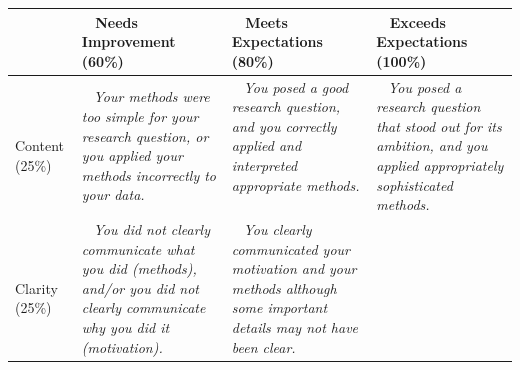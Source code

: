 \documentclass{article}
\begin{document}
      \vspace{5mm}
      \hspace{-15mm}
      \begin{tabular}{|>{\centering\arraybackslash}p{2.5cm}|>{\centering\arraybackslash}p{5cm}|>{\centering\arraybackslash}p{5cm}|>{\centering\arraybackslash}p{5cm}|}
        \hline
          ~
          \newline ~ & ~ \newline
          Needs Improvement (60\%)
          \newline ~ & ~ \newline
          Meets Expectations (80\%)
          \newline ~ & ~ \newline
          Exceeds Expectations (100\%)
          \newline ~\\
        \hline
        ~ \newline
        Content \newline (25\%)
          \newline ~ & ~ \newline
          \it Your methods were too simple for your research question, or you applied your methods incorrectly to your data.
          \newline ~ & ~ \newline
          \it You posed a good research question, and you correctly applied and interpreted appropriate methods.
          \newline ~ & ~ \newline
          \it You posed a research question that stood out for its ambition, and you applied appropriately sophisticated methods.
          \newline ~\\
        \hline
        ~ \newline
        Clarity \newline (25\%)
          \newline ~ & ~ \newline
          \it You did not clearly communicate what you did (methods), and/or you did not clearly communicate why you did it (motivation).
          \newline ~ & ~ \newline
          \it You clearly communicated your motivation and your methods although some important details may not have been clear.
          \newline ~ & ~ \newline

\end{tabular}
\end{document}
